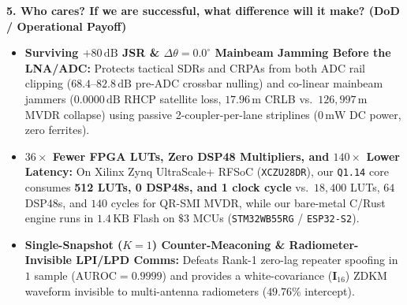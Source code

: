 \documentclass[10pt,a4paper]{article}
\begin{document}
\textbf{5. Who cares? If we are successful, what difference will it make? (DoD / Operational Payoff)}
\begin{itemize}
    \item \textbf{Surviving $+80\,\mathrm{dB}$ JSR \& $\Delta\theta = 0.0^\circ$ Mainbeam Jamming Before the LNA/ADC:} Protects tactical SDRs and CRPAs from both ADC rail clipping ($68.4\text{--}82.8\,\mathrm{dB}$ pre-ADC crossbar nulling) and co-linear mainbeam jammers ($0.0000\,\mathrm{dB}$ RHCP satellite loss, $17.96\,\mathrm{m}$ CRLB vs.\ $126{,}997\,\mathrm{m}$ MVDR collapse) using passive 2-coupler-per-lane striplines ($0\,\mathrm{mW}$ DC power, zero ferrites).
    \item \textbf{$36\times$ Fewer FPGA LUTs, Zero DSP48 Multipliers, and $140\times$ Lower Latency:} On Xilinx Zynq UltraScale+ RFSoC (\texttt{XCZU28DR}), our \texttt{Q1.14} core consumes \textbf{512 LUTs, 0 DSP48s, and 1 clock cycle} vs.\ $18{,}400$ LUTs, $64$ DSP48s, and $140$ cycles for QR-SMI MVDR, while our bare-metal C/Rust engine runs in $1.4\,\mathrm{KB}$ Flash on $\$3$ MCUs (\texttt{STM32WB55RG} / \texttt{ESP32-S2}).
    \item \textbf{Single-Snapshot ($K=1$) Counter-Meaconing \& Radiometer-Invisible LPI/LPD Comms:} Defeats Rank-1 zero-lag repeater spoofing in $1$ sample ($\mathrm{AUROC}=0.9999$) and provides a white-covariance ($\bm{I}_{16}$) ZDKM waveform invisible to multi-antenna radiometers ($49.76\%$ intercept).
\end{itemize}
\end{document}

